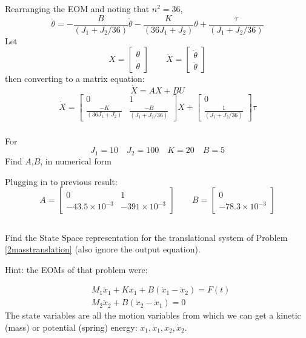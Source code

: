\documentclass{article}	%
\begin{document}
\begin{solution}
Rearranging the EOM and noting that $n^2 = 36$,
\[
\ddot{\theta} = -\frac{B}{(J_1+J_2/36)}\dot{\theta} - \frac{K}{(36J_1+J_2)}\theta + \frac{\tau}{(J_1+J_2/36)}
\]
Let
\[
X = \begin{bmatrix} \theta \\ \dot{\theta} \end{bmatrix}
\qquad
\dot{X} = \begin{bmatrix} \dot{\theta}\\ \ddot{\theta} \end{bmatrix}
\]
then converting to a matrix equation:
\[
\dot{X}  = AX  + BU
\]
\[
\dot{X} = \begin{bmatrix}0&1\\
\frac{-K}{(36J_1+J_2)} & \frac{-B}{(J_1+J_2/36)} \end{bmatrix} X +
\begin{bmatrix}0 \\ \frac{1}{(J_1+J_2/36)}\end{bmatrix} \tau
\]
\end{solution}


\subsubsection{}
For
\[
J_1 = 10 \quad J_2 = 100 \quad K=20 \quad B=5
\]
Find $A$,$B$, in numerical form

\begin{solution}
Plugging in to previous result:
\[
A = \begin{bmatrix} 0 & 1 \\ -43.5\times10^{-3} & -391\times10^{-3}
\end{bmatrix}
\qquad
B = \begin{bmatrix} 0 \\ -78.3\times10^{-3} \end{bmatrix}
\]
\end{solution}


\subsection{}\label{ICPss_2mass}
Find the State Space representation for the translational system of Problem \ref{2masstranslation}
(also ignore the output equation).

Hint: the EOMs of that problem were:

\begin{align*}
&M_1\ddot{x}_1+Kx_1+B(\dot{x}_1-\dot{x}_2) = F(t)  \\
&M_2\ddot{x}_2+B(\dot{x}_2-\dot{x}_1) = 0
\end{align*}
The state variables are all the motion variables from which we can get a kinetic (mass) or potential
(spring) energy:  $x_1, \dot{x}_1,x_2, \dot{x}_2$.
\end{document}
